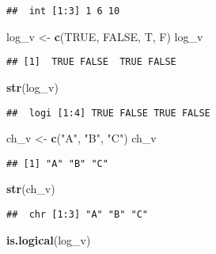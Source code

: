 \documentclass[
]{article}
\newenvironment{Shaded}{\begin{snugshade}}{\end{snugshade}}
\newcommand{\ConstantTok}[1]{\textcolor[rgb]{0.56,0.35,0.01}{#1}}
\newcommand{\FunctionTok}[1]{\textcolor[rgb]{0.13,0.29,0.53}{\textbf{#1}}}
\newcommand{\NormalTok}[1]{#1}
\newcommand{\OtherTok}[1]{\textcolor[rgb]{0.56,0.35,0.01}{#1}}
\newcommand{\StringTok}[1]{\textcolor[rgb]{0.31,0.60,0.02}{#1}}
\begin{document}
\begin{verbatim}
##  int [1:3] 1 6 10
\end{verbatim}

\begin{Shaded}
\begin{Highlighting}[]
\NormalTok{log\_v }\OtherTok{\textless{}{-}} \FunctionTok{c}\NormalTok{(}\ConstantTok{TRUE}\NormalTok{, }\ConstantTok{FALSE}\NormalTok{, T, F)}
\NormalTok{log\_v}
\end{Highlighting}
\end{Shaded}

\begin{verbatim}
## [1]  TRUE FALSE  TRUE FALSE
\end{verbatim}

\begin{Shaded}
\begin{Highlighting}[]
\FunctionTok{str}\NormalTok{(log\_v)}
\end{Highlighting}
\end{Shaded}

\begin{verbatim}
##  logi [1:4] TRUE FALSE TRUE FALSE
\end{verbatim}

\begin{Shaded}
\begin{Highlighting}[]
\NormalTok{ch\_v }\OtherTok{\textless{}{-}} \FunctionTok{c}\NormalTok{(}\StringTok{"A"}\NormalTok{, }\StringTok{"B"}\NormalTok{, }\StringTok{"C"}\NormalTok{)}
\NormalTok{ch\_v}
\end{Highlighting}
\end{Shaded}

\begin{verbatim}
## [1] "A" "B" "C"
\end{verbatim}

\begin{Shaded}
\begin{Highlighting}[]
\FunctionTok{str}\NormalTok{(ch\_v)}
\end{Highlighting}
\end{Shaded}

\begin{verbatim}
##  chr [1:3] "A" "B" "C"
\end{verbatim}

\begin{Shaded}
\begin{Highlighting}[]
\FunctionTok{is.logical}\NormalTok{(log\_v)}
\end{Highlighting}
\end{Shaded}
\end{document}

